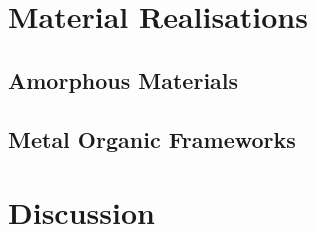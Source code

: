 \hypertarget{material-realisations}{%
\section{Material Realisations}\label{material-realisations}}

\hypertarget{amorphous-materials}{%
\subsection{Amorphous Materials}\label{amorphous-materials}}

\hypertarget{metal-organic-frameworks}{%
\subsection{Metal Organic Frameworks}\label{metal-organic-frameworks}}

\hypertarget{discussion}{%
\section{Discussion}\label{discussion}}
